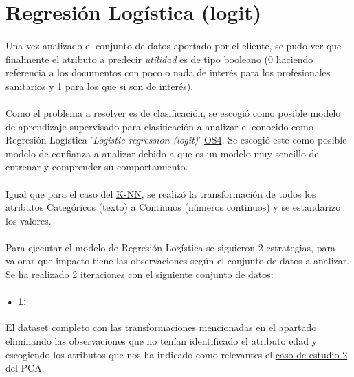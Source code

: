 \section{Regresión Logística (logit)}
\label{section:lr}

\paragraph{}
Una vez analizado el conjunto de datos aportado por el cliente, se pudo ver que finalmente el atributo a predecir \textit{utilidad} es de tipo booleano (0 haciendo referencia a los documentos con poco o nada de interés para los profesionales sanitarios y 1 para los que si son de interés).

\paragraph{}
Como el problema a resolver es de clasificación, se escogió como posible modelo de aprendizaje supervisado para clasificación a analizar el conocido como Regresión Logística '\textit{Logistic regression (logit)}'\cite{ref:lr_def} \hyperref[os:OS4]{OS4}. Se escogió este como posible modelo de confianza a analizar debido a que es un modelo muy sencillo de entrenar y comprender su comportamiento\cite{ref:lr_understanding}.

\paragraph{}
Igual que para el caso del \hyperref[section:knn]{K-NN}, se realizó la transformación de todos los atributos Categóricos (texto) a Continuos (números continuos) y se estandarizo los valores.

\paragraph{}
Para ejecutar el modelo de Regresión Logística se siguieron 2 estrategias, para valorar que impacto tiene las observaciones según el conjunto de datos a analizar. Se ha realizado 2 iteraciones con el siguiente conjunto de datos:

\label{section:lr_casos}
\paragraph{• 1: } El dataset completo con las transformaciones mencionadas en el apartado  eliminando las observaciones que no tenían identificado el atributo edad y escogiendo los atributos que nos ha indicado como relevantes el \hyperref[result:pca_case2]{caso de estudio 2} del PCA.

